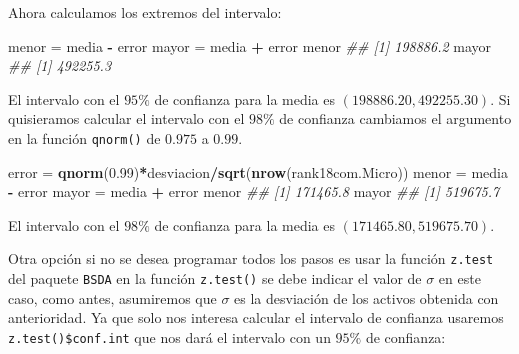 \documentclass[letterpaper,]{book}
\newenvironment{Shaded}{\begin{snugshade}}{\end{snugshade}}
\newcommand{\CommentTok}[1]{\textcolor[rgb]{0.56,0.35,0.01}{\textit{#1}}}
\newcommand{\DataTypeTok}[1]{\textcolor[rgb]{0.13,0.29,0.53}{#1}}
\newcommand{\FloatTok}[1]{\textcolor[rgb]{0.00,0.00,0.81}{#1}}
\newcommand{\KeywordTok}[1]{\textcolor[rgb]{0.13,0.29,0.53}{\textbf{#1}}}
\newcommand{\NormalTok}[1]{#1}
\newcommand{\OperatorTok}[1]{\textcolor[rgb]{0.81,0.36,0.00}{\textbf{#1}}}
\newcommand{\StringTok}[1]{\textcolor[rgb]{0.31,0.60,0.02}{#1}}
\begin{document}
Ahora calculamos los extremos del intervalo:

\begin{Shaded}
\begin{Highlighting}[]

\NormalTok{menor =}\StringTok{ }\NormalTok{media }\OperatorTok{-}\StringTok{ }\NormalTok{error}
\NormalTok{mayor =}\StringTok{ }\NormalTok{media }\OperatorTok{+}\StringTok{ }\NormalTok{error}
\NormalTok{menor}
\CommentTok{## [1] 198886.2}
\NormalTok{mayor}
\CommentTok{## [1] 492255.3}
\end{Highlighting}
\end{Shaded}

El intervalo con el \(95\%\) de confianza para la media es \(\left( 198886.20, 492255.30 \right)\). Si quisieramos calcular el intervalo con el \(98\%\) de confianza cambiamos el argumento en la función \texttt{qnorm()} de \(0.975\) a \(0.99\).

\begin{Shaded}
\begin{Highlighting}[]

\NormalTok{error  =}\StringTok{ }\KeywordTok{qnorm}\NormalTok{(}\FloatTok{0.99}\NormalTok{)}\OperatorTok{*}\NormalTok{desviacion}\OperatorTok{/}\KeywordTok{sqrt}\NormalTok{(}\KeywordTok{nrow}\NormalTok{(rank18com.Micro))}
\NormalTok{menor =}\StringTok{ }\NormalTok{media }\OperatorTok{-}\StringTok{ }\NormalTok{error}
\NormalTok{mayor =}\StringTok{ }\NormalTok{media }\OperatorTok{+}\StringTok{ }\NormalTok{error}
\NormalTok{menor}
\CommentTok{## [1] 171465.8}
\NormalTok{mayor}
\CommentTok{## [1] 519675.7}
\end{Highlighting}
\end{Shaded}

El intervalo con el \(98\%\) de confianza para la media es \(\left( 171465.80, 519675.70 \right)\).

Otra opción si no se desea programar todos los pasos es usar la función \texttt{z.test} del paquete \texttt{BSDA} en la función \texttt{z.test()} se debe indicar el valor de \(\sigma\) en este caso, como antes, asumiremos que \(\sigma\) es la desviación de los activos obtenida con anterioridad. Ya que solo nos interesa calcular el intervalo de confianza usaremos \texttt{z.test()\$conf.int} que nos dará el intervalo con un \(95\%\) de confianza:

\begin{Shaded}
\end{Shaded}
\end{document}
